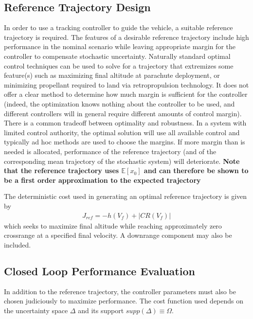 \documentclass[10pt,a4paper]{article}
\begin{document}
		
		
		
	
	\subsection{Reference Trajectory Design}
	In order to use a tracking controller to guide the vehicle, a suitable reference trajectory is required. The features of a desirable reference trajectory include high performance in the nominal scenario while leaving appropriate margin for the controller to compensate stochastic uncertainty. Naturally standard optimal control techniques can be used to solve for a trajectory that extremizes some feature(s) such as maximizing final altitude at parachute deployment, or minimizing propellant required to land via retropropulsion technology. It does not offer a clear method to determine how much margin is sufficient for the controller (indeed, the optimization knows nothing about the controller to be used, and different controllers will in general require different amounts of control margin). There is a common tradeoff between optimality and robustness. In a system with limited control authority, the optimal solution will use all available control and typically ad hoc methods are used to choose the margins. If more margin than is needed is allocated, performance of the reference trajectory (and of the corresponding mean trajectory of the stochastic system) will deteriorate. \textbf{Note that the reference trajectory uses $ \mathbb{E}[x_0] $ and can therefore be shown to be a first order approximation to the expected trajectory}
	
	The deterministic cost used in generating an optimal reference trajectory is given by 
	\begin{align}
	J_{ref} = -h(V_f) + |CR(V_f)| \label{eq_cost_deterministic}
	\end{align}
	which seeks to maximize final altitude while reaching approximately zero crossrange at a specified final velocity. A downrange component may also be included. 
			
	\subsection{Closed Loop Performance Evaluation}		
	In addition to the reference trajectory, the controller parameters must also be chosen judiciously to maximize performance. The cost function used depends on the uncertainty space $ \Delta $ and its support $supp(\Delta)\equiv\Omega$.		
			
\end{document}
